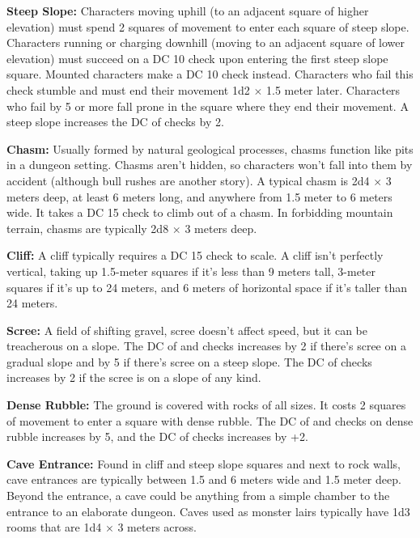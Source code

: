 \textbf{Steep Slope:} Characters moving uphill (to an adjacent square of higher elevation) must spend 2 squares of movement to enter each square of steep slope. Characters running or charging downhill (moving to an adjacent square of lower elevation) must succeed on a DC 10  check upon entering the first steep slope square. Mounted characters make a DC 10  check instead. Characters who fail this check stumble and must end their movement 1d2 $\times$ 1.5 meter later. Characters who fail by 5 or more fall prone in the square where they end their movement. A steep slope increases the DC of  checks by 2.

\textbf{Chasm:} Usually formed by natural geological processes, chasms function like pits in a dungeon setting. Chasms aren't hidden, so characters won't fall into them by accident (although bull rushes are another story). A typical chasm is 2d4 $\times$ 3 meters deep, at least 6 meters long, and anywhere from 1.5 meter to 6 meters wide. It takes a DC 15  check to climb out of a chasm. In forbidding mountain terrain, chasms are typically 2d8 $\times$ 3 meters deep.

\textbf{Cliff:} A cliff typically requires a DC 15  check to scale. A cliff isn't perfectly vertical, taking up 1.5-meter squares if it's less than 9 meters tall, 3-meter squares if it's up to 24 meters, and 6 meters of horizontal space if it's taller than 24 meters.

\textbf{Scree:} A field of shifting gravel, scree doesn't affect speed, but it can be treacherous on a slope. The DC of  and  checks increases by 2 if there's scree on a gradual slope and by 5 if there's scree on a steep slope. The DC of  checks increases by 2 if the scree is on a slope of any kind.

\textbf{Dense Rubble:} The ground is covered with rocks of all sizes. It costs 2 squares of movement to enter a square with dense rubble. The DC of  and  checks on dense rubble increases by 5, and the DC of  checks increases by +2.

\textbf{Cave Entrance:} Found in cliff and steep slope squares and next to rock walls, cave entrances are typically between 1.5 and 6 meters wide and 1.5 meter deep. Beyond the entrance, a cave could be anything from a simple chamber to the entrance to an elaborate dungeon. Caves used as monster lairs typically have 1d3 rooms that are 1d4 $\times$ 3 meters across.

